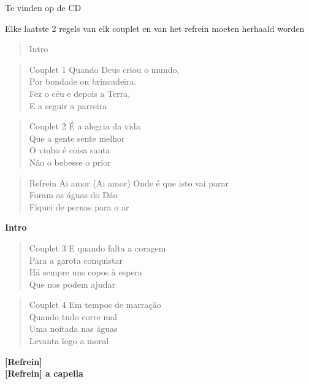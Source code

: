 \begin{center}
Te vinden op de CD
\end{center}
Elke laatste 2 regels van elk couplet en van het refrein moeten herhaald worden\\
\begin{verse}{Intro}

\end{verse}

\begin{verse}{Couplet 1}
Quando Deus criou o mundo,\\ 		         
Por bondade ou brincadeira.\\
Fez o céu e depois a Terra,\\ 
E a seguir a parreira\\
\end{verse}

\begin{verse}{Couplet 2}
É a alegria da vida\\ 		        
Que a gente sente melhor\\           
O vinho é coisa santa\\
Não o bebesse o prior\\
\end{verse}

\begin{verse}{Refrein}
Ai amor (Ai amor) Onde é que isto vai parar \\
Foram as águas do Dão\\
Fiquei de pernas para o ar\\ 
\end{verse}

\textbf{Intro}\\

\begin{verse}{Couplet 3}
E quando falta a coragem\\ 
Para a garota conquistar \\
Há sempre uns copos à espera\\ 
Que nos podem ajudar\\
\end{verse}

\begin{verse}{Couplet 4}
Em tempos de marração\\ 
Quando tudo corre mal \\
Uma noitada nas águas \\
Levanta logo a moral \\
\end{verse}

\textbf{[Refrein]}\\
\textbf{[Refrein] a capella}\\

